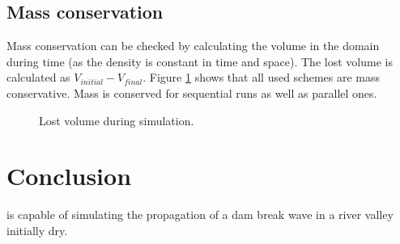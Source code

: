 \subsection{Mass conservation}

Mass conservation can be checked by calculating the volume in the domain during
time (as the density is constant in time and space).
The lost volume is calculated as $V_{initial} - V_{final}$.
Figure \ref{fig:malpasset:lostvol} shows that all used schemes are mass
conservative.
Mass is conserved for sequential runs as well as parallel ones.

\begin{figure}[H]
\centering
{}
\caption{Lost volume during simulation.}
\label{fig:malpasset:lostvol}
\end{figure}

\section{Conclusion}
 is capable of simulating the propagation of a dam break wave in a
river valley initially dry.
